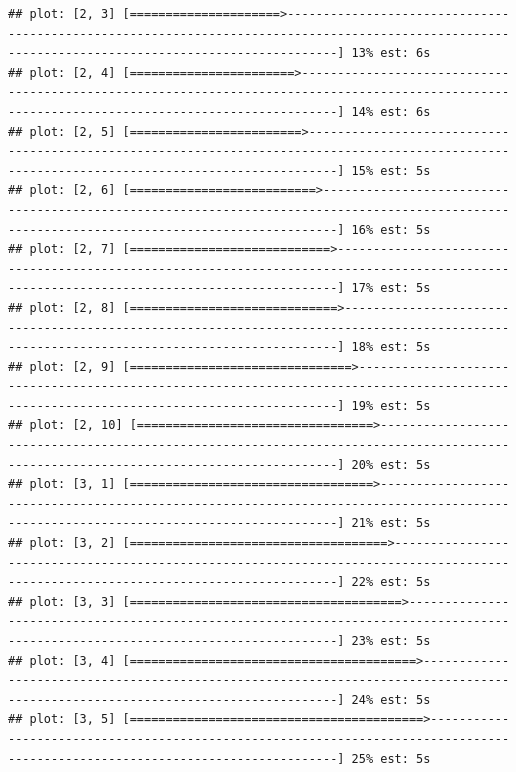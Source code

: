 \documentclass[
]{article}
\begin{document}
\begin{verbatim}
## plot: [2, 3] [=====================>---------------------------------------------------------------------------------------------------------------------------------------------------] 13% est: 6s 
## plot: [2, 4] [=======================>-------------------------------------------------------------------------------------------------------------------------------------------------] 14% est: 6s 
## plot: [2, 5] [========================>------------------------------------------------------------------------------------------------------------------------------------------------] 15% est: 5s 
## plot: [2, 6] [==========================>----------------------------------------------------------------------------------------------------------------------------------------------] 16% est: 5s 
## plot: [2, 7] [============================>--------------------------------------------------------------------------------------------------------------------------------------------] 17% est: 5s 
## plot: [2, 8] [=============================>-------------------------------------------------------------------------------------------------------------------------------------------] 18% est: 5s 
## plot: [2, 9] [===============================>-----------------------------------------------------------------------------------------------------------------------------------------] 19% est: 5s 
## plot: [2, 10] [=================================>--------------------------------------------------------------------------------------------------------------------------------------] 20% est: 5s 
## plot: [3, 1] [==================================>--------------------------------------------------------------------------------------------------------------------------------------] 21% est: 5s 
## plot: [3, 2] [====================================>------------------------------------------------------------------------------------------------------------------------------------] 22% est: 5s 
## plot: [3, 3] [======================================>----------------------------------------------------------------------------------------------------------------------------------] 23% est: 5s 
## plot: [3, 4] [========================================>--------------------------------------------------------------------------------------------------------------------------------] 24% est: 5s 
## plot: [3, 5] [=========================================>-------------------------------------------------------------------------------------------------------------------------------] 25% est: 5s 

\end{verbatim}
\end{document}
